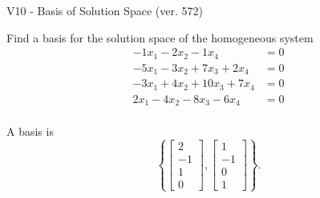 \begin{exercise}
  \begin{exerciseTitle}V10 - Basis of Solution Space (ver. 572)\end{exerciseTitle}
  \begin{exerciseStatement}
    Find a basis for the solution space of the homogeneous system 
\begin{align*}
 -1 x_ 1 -2 x_ 2 -1 x_ 4 &= 0  \\ 
  -5 x_ 1 -3 x_ 2 + 7 x_ 3 + 2 x_ 4 &= 0  \\ 
  -3 x_ 1 + 4 x_ 2 + 10 x_ 3 + 7 x_ 4 &= 0  \\ 
  2 x_ 1 -4 x_ 2 -8 x_ 3 -6 x_ 4 &= 0  \\ 
 \end{align*}


 
  \end{exerciseStatement}

  \begin{exerciseAnswer}
   A basis is   
\[\left\{\left[\begin{array}{c}
2 \\
-1 \\
1 \\
0
\end{array}\right] , \left[\begin{array}{c}
1 \\
-1 \\
0 \\
1
\end{array}\right]\right\}.\]

  


  \end{exerciseAnswer}
\end{exercise}